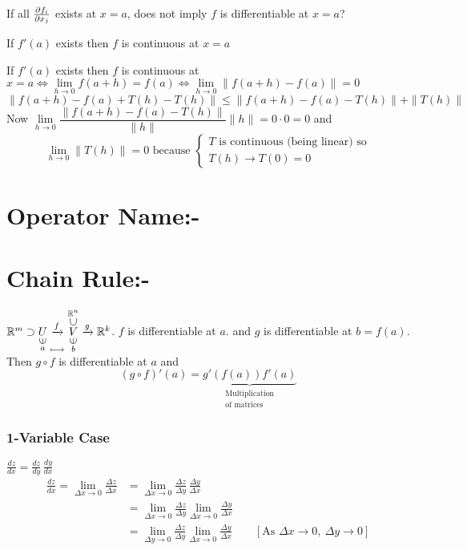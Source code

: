 If all $\frac{\partial f_i}{\partial x_j}$ exists at $x=a$, does not imply  $f$ is differentiable at $x=a$?
\begin{Theorem}{}{}
	If $f'(a)$ exists then $f$ is continuous at $x=a$
\end{Theorem}
\begin{myproof}
	If $f'(a)$ exists then $f$ is continuous at $x=a\iff\lim\limits_{h\to 0}f(a+h)=f(a)\iff\lim\limits_{h\to 0}\|f(a+h)-f(a)\|=0$
	$$\|f(a+h)-f(a)+T(h)-T(h)\|\leq \|f(a+h)-f(a)-T(h)\|+\|T(h)\|$$Now $\lim\limits_{h\to 0}\dfrac{\|f(a+h)-f(a)-T(h)\|}{\|h\|}\|h\|=0\cdot 0=0$ and $$\lim_{h\to 0}\|T(h)\|=0\text{ because }\begin{cases*}
		T\text{ is continuous (being linear) so}\\
		T(h)\to T(0)=0
	\end{cases*}$$
\end{myproof}

\section{Operator Name:-}

\section{Chain Rule:-}

\begin{Theorem}{}{}
	$\bbR^m\supset \underset{  \substack{{\uin} \\ {a}}  }{U} \underset{  \substack{\quad \\[0.25cm]\longmapsto}}{\xrightarrow{f}}   \underset{\substack{  \uin \\ b}}{  \overset{\substack{{\bbR^n} \\ \usubset}}{V}  }\xrightarrow{g}\bbR^k $. $f$ is differentiable at $a$. and $g$  is differentiable at $b=f(a)$. Then $g\circ f$ is differentiable at $a$  and $$(g\circ f)'(a)=\underbrace{g'(f(a))f'(a)}_{\substack{\text{Multiplication}\\ \text{of matrices}}}$$
\end{Theorem}
\begin{myproof}
	\subsubsection{1-Variable Case}
	$\frac{dz}{dx}=\frac{dz}{dy}\, \frac{dy}{dx}$\begin{align*}
		\frac{dz}{dx} =\lim_{\Delta x\to 0} \frac{\Delta z}{\Delta x} &=\lim_{\Delta x\to 0}\frac{\Delta z}{\Delta y}\, \frac{\Delta y}{\Delta x}\\
		& =\lim_{\Delta x\to 0}\frac{\Delta z}{\Delta y}\lim_{\Delta x\to 0} \frac{\Delta y}{\Delta x}\\
		& =\lim_{\Delta y\to 0}\frac{\Delta z}{\Delta y}\lim_{\Delta x\to 0} \frac{\Delta y}{\Delta x}\qquad [\text{As }\Delta x\to0,\ \Delta y\to 0]
	\end{align*}
\end{myproof}